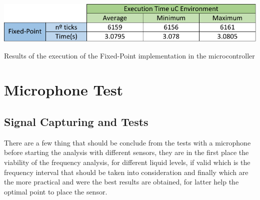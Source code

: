 \begin{table}
    \centering
    \includegraphics[width=1\textwidth]{Chapters/6CHP/Figures/excTimeuC.pdf}
    \caption{Results of the execution of the Fixed-Point implementation in the microcontroller}
    \label{tab:excTimeuC}
\end{table}
\section{Microphone Test}
\subsection{Signal Capturing and Tests}
There are a few thing that should be conclude from the tests with a microphone before starting the analysis with different sensors, they are in the first place the viability of the frequency analysis, for different liquid levels, if valid which is the frequency interval that should be taken into consideration and finally which are the more practical and were the best results are obtained, for latter help the optimal point to place the sensor. 

